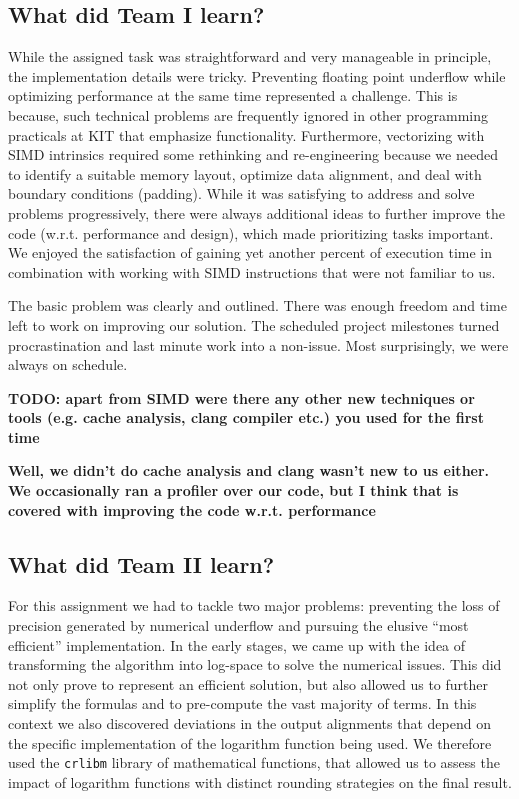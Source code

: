\documentclass[runningheads,a4paper]{llncs}
\begin{document}
\subsection{What did Team I learn?}
While the assigned task was straightforward and very manageable in principle,
the implementation details were tricky.
Preventing floating point underflow while optimizing performance at the same time represented a challenge. 
This is because, such technical problems are frequently ignored in other programming practicals at KIT 
that emphasize functionality. 
Furthermore, vectorizing with SIMD intrinsics required some rethinking and re-engineering 
because we needed to identify a suitable memory layout, optimize data alignment, 
and deal with boundary conditions (padding). 
While it was satisfying to address and solve problems progressively, 
there were always additional ideas to further improve the code (w.r.t. performance and design), 
which made prioritizing tasks important.
We enjoyed the satisfaction of gaining yet another percent of execution time in combination 
with working with SIMD instructions that were not familiar to us.

The basic problem was clearly and outlined. There was enough freedom and time left 
to work on improving our solution. The scheduled project milestones 
turned procrastination and last minute work into a non-issue. 
Most surprisingly, we were always on schedule.

{\bf TODO: apart from SIMD were there any other new techniques or tools (e.g. cache analysis, clang compiler etc.) you used for the first time}

{\bf Well, we didn't do cache analysis and clang wasn't new to us either. We occasionally ran a profiler over our code, but I think that is covered with improving the code w.r.t. performance}

\subsection{What did Team II learn?}
For this assignment we had to tackle two major problems: preventing the loss of precision generated by numerical underflow and 
pursuing the elusive ``most efficient'' implementation. 
In the early stages, we came up with the idea of transforming the algorithm into log-space to solve the numerical issues. 
This did not only prove to represent an efficient solution, but also allowed us to further simplify the formulas and to pre-compute the vast majority of terms. 
In this context we also discovered deviations in the output alignments
that depend on the specific implementation of the logarithm function being used. 
We therefore used the \texttt{crlibm} library of mathematical functions, that allowed us to assess the impact of logarithm functions with distinct rounding strategies
on the final result.
\end{document}
